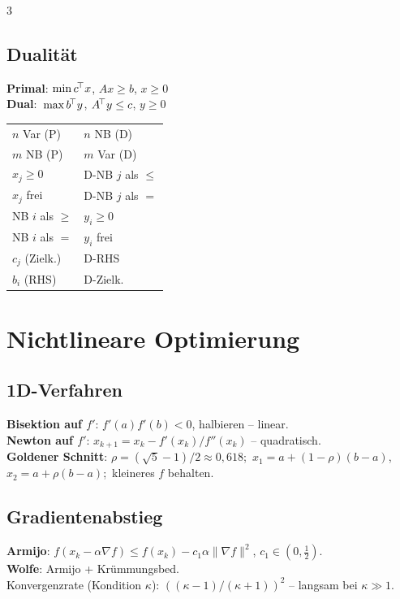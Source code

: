 \documentclass[8pt,a4paper]{extarticle}
\begin{document}
\begin{multicols*}{3}
\subsection{Dualit\"at}
\textbf{Primal}: $\min c^{\!\top} x$, $Ax\ge b$, $x\ge 0$\\
\textbf{Dual}:\ $\max b^{\!\top} y$, $A^{\!\top} y\le c$, $y\ge 0$
\begin{tabularx}{\linewidth}{@{}l@{\ \,}X@{}}
$n$ Var (P) & $n$ NB (D) \\
$m$ NB (P) & $m$ Var (D) \\
$x_j\!\ge\!0$ & D-NB $j$ als $\le$ \\
$x_j$ frei & D-NB $j$ als $=$ \\
NB $i$ als $\ge$ & $y_i\!\ge\!0$ \\
NB $i$ als $=$ & $y_i$ frei \\
$c_j$ (Zielk.) & D-RHS \\
$b_i$ (RHS) & D-Zielk. \\
\end{tabularx}

\section{Nichtlineare Optimierung}
\subsection{1D-Verfahren}
\textbf{Bisektion auf $f'$}: $f'(a)f'(b)<0$, halbieren -- linear.\\
\textbf{Newton auf $f'$}: $x_{k+1}=x_k-f'(x_k)/f''(x_k)$ -- quadratisch.\\
\textbf{Goldener Schnitt}: $\rho{=}(\sqrt5{-}1)/2\!\approx\!0{,}618$;\ $x_1{=}a{+}(1{-}\rho)(b{-}a)$,\ $x_2{=}a{+}\rho(b{-}a)$;\ kleineres $f$ behalten.

\subsection{Gradientenabstieg}
\textbf{Armijo}: $f(x_k{-}\alpha\nabla f)\le f(x_k){-}c_1\alpha\|\nabla f\|^2$, $c_1\!\in\!(0,\tfrac12)$.\\
\textbf{Wolfe}: Armijo + Kr\"ummungsbed.\ \\
Konvergenzrate (Kondition $\kappa$): $((\kappa{-}1)/(\kappa{+}1))^2$ -- langsam bei $\kappa\!\gg\!1$.


\end{multicols*}
\end{document}
